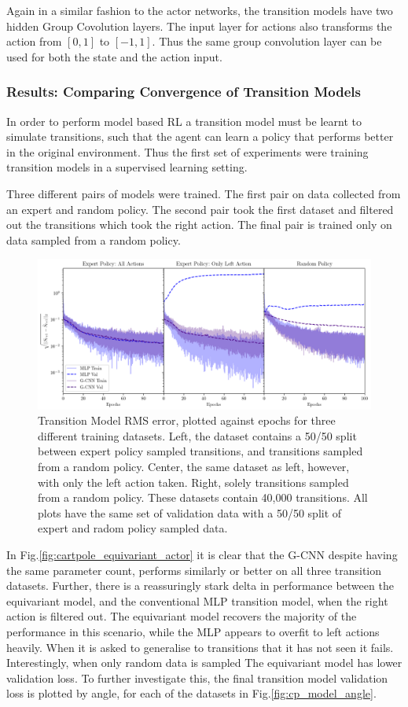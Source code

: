 Again in a similar fashion to the actor networks, the transition models have two hidden Group Covolution layers. The input layer for actions also transforms the action from $[0, 1]$ to $[-1, 1]$. Thus the same group convolution layer can be used for both the state and the action input.


\subsubsection{Results: Comparing Convergence of Transition Models}
In order to perform model based RL a transition model must be learnt to simulate transitions, such that the agent can learn a policy that performs better in the original environment. Thus the first set of experiments were training transition models in a supervised learning setting.

Three different pairs of models were trained. The first pair on data collected from an expert and random policy. The second pair took the first dataset and filtered out the transitions which took the right action. The final pair is trained only on data sampled from a random policy.
\begin{figure}
	\centering
	\includegraphics*[width=\linewidth]{Figures/transition_model_cp.png}
	\caption{Transition Model RMS error, plotted against epochs for three different training datasets. Left, the dataset contains a 50/50 split between expert policy sampled transitions, and transitions sampled from a random policy. Center, the same dataset as left, however, with only the left action taken. Right, solely transitions sampled from a random policy. These datasets contain 40,000 transitions. All plots have the same set of validation data with a 50/50 split of expert and radom policy sampled data.}
	\label{fig:transition_model_cp}
\end{figure}
In Fig.\ref{fig:cartpole_equivariant_actor} it is clear that the G-CNN despite having the same parameter count, performs similarly or better on all three transition datasets. Further, there is a reassuringly stark delta in performance between the equivariant model, and the conventional MLP transition model, when the right action is filtered out. The equivariant model recovers the majority of the performance in this scenario, while the MLP appears to overfit to left actions heavily. When it is asked to generalise to transitions that it has not seen it fails. Interestingly, when only random data is sampled The equivariant model has lower validation loss. To further investigate this, the final transition model validation loss is plotted by angle, for each of the datasets in Fig.\ref{fig:cp_model_angle}.

